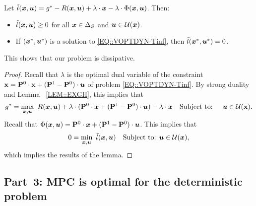 \begin{lemma}
    \label{LEM::DISS}   
    Let $\Tilde{l}({\bm{x}}, \bm{u}) = g^* - R({\bm{x}},\bm{u}) + \lambda \cdot {\bm{x}} - \lambda \cdot \Phi({\bm{x}},\bm{u})$. Then:
    \begin{itemize}
        \item $\Tilde{l}({\bm{x}}, \bm{u})\ge0$ for all ${\bm{x}}\in\Delta_{\mathcal{S}}$ and $\bm{u}\in\mathcal{U}({\bm{x}})$.
        \item If $({\bm{x}}^*,\bm{u}^*)$ is a solution to \eqref{EQ::VOPTDYN-Tinf}, then $\Tilde{l}({\bm{x}}^*, \bm{u}^*)=0$.
    \end{itemize}
    This shows that our problem is dissipative.
\end{lemma}
\begin{proof}
    Recall that $\lambda$ is the optimal dual variable of the constraint $\textbf{x} = \mathbf{P}^{0} \cdot \textbf{x} +  (\mathbf{P}^{1} - \mathbf{P}^{0}) \cdot \bm{u}$ of problem \eqref{EQ::VOPTDYN-Tinf}. By strong duality and Lemma ~\ref{LEM::EXGH}, this implies that
    \begin{align*}
       g^* &= \max_{\bx, \bu}~ R(\bx, \bu) + \lambda \cdot (\Pmat{0} \cdot \bx +  (\Pmat{1} - \Pmat{0}) \cdot \bu)-\lambda \cdot \bx %
        &\text{Subject to: }\quad
        \bu \in \mcl{U}(\mB).%
    \end{align*}
    Recall that $\Phi({\bm{x}},\bm{u})=\mathbf{P}^{0} \cdot {\bm{x}} +  (\mathbf{P}^{1} - \mathbf{P}^{0}) \cdot \bm{u}$. This implies that
    \begin{align*}
       0 &= \min_{\bx, \bu}~ \rotcost{l}{\bx}{\bu}%
        &\text{Subject to: }
        \bu \in \mcl{U}(\bx),%
    \end{align*}
    which implies the results of the lemma.
\end{proof}
    
\subsection{Part~3: MPC is optimal for the deterministic problem}
\label{apx:MPC}

